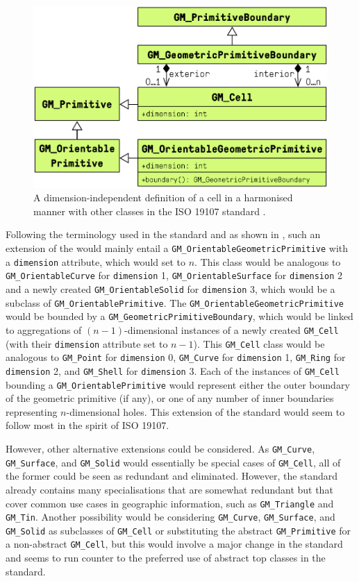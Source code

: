 \begin{figure}
\centering
  \includegraphics[width=0.7\linewidth]{figs/iso-cell-brep}
  \caption[A dimension-independent cell harmonised with ISO 19107]{A dimension-independent definition of a cell in a harmonised manner with other classes in the ISO 19107 standard \citep{ISO19107:2005}.}
\label{fig:iso-cell-brep}
\end{figure}

Following the terminology used in the standard and as shown in , such an extension of the would mainly entail a \texttt{GM\_OrientableGeometricPrimitive} with a \texttt{dimension} attribute, which would set to $n$.
This class would be analogous to \texttt{GM\_OrientableCurve} for \texttt{dimension} 1, \texttt{GM\_OrientableSurface} for \texttt{dimension} 2 and a newly created \texttt{GM\_OrientableSolid} for \texttt{dimension} 3, which would be a subclass of \texttt{GM\_OrientablePrimitive}.
The \texttt{GM\_OrientableGeometricPrimitive} would be bounded by a \texttt{GM\_GeometricPrimitiveBoundary}, which would be linked to aggregations of $(n-1)$-dimensional instances of a newly created \texttt{GM\_Cell} (with their \texttt{dimension} attribute set to $n-1$).
This \texttt{GM\_Cell} class would be analogous to \texttt{GM\_Point} for \texttt{dimension} 0, \texttt{GM\_Curve} for \texttt{dimension} 1, \texttt{GM\_Ring} for \texttt{dimension} 2, and \texttt{GM\_Shell} for \texttt{dimension} 3.
Each of the instances of \texttt{GM\_Cell} bounding a \texttt{GM\_OrientablePrimitive} would represent either the outer boundary of the geometric primitive (if any), or one of any number of inner boundaries representing $n$-dimensional holes.
This extension of the standard would seem to follow most in the spirit of ISO 19107.

However, other alternative extensions could be considered.
As \texttt{GM\_Curve}, \texttt{GM\_Surface}, and \texttt{GM\_Solid} would essentially be special cases of \texttt{GM\_Cell}, all of the former could be seen as redundant and eliminated.
However, the standard already contains many specialisations that are somewhat redundant but that cover common use cases in geographic information, such as \texttt{GM\_Triangle} and \texttt{GM\_Tin}.
Another possibility would be considering \texttt{GM\_Curve}, \texttt{GM\_Surface}, and \texttt{GM\_Solid} as subclasses of \texttt{GM\_Cell} or substituting the abstract \texttt{GM\_Primitive} for a non-abstract \texttt{GM\_Cell}, but this would involve a major change in the standard and seems to run counter to the preferred use of abstract top classes in the standard.

